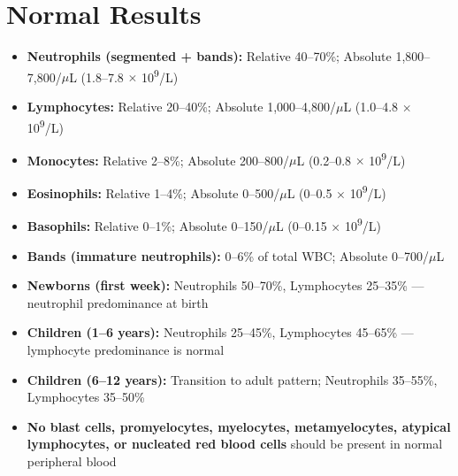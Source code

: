 \section*{Normal Results}
\begin{itemize}
  \item \textbf{Neutrophils (segmented + bands):} Relative 40--70\%; Absolute 1,800--7,800/$\mu$L (1.8--7.8 $\times$ 10\textsuperscript{9}/L)
  \item \textbf{Lymphocytes:} Relative 20--40\%; Absolute 1,000--4,800/$\mu$L (1.0--4.8 $\times$ 10\textsuperscript{9}/L)
  \item \textbf{Monocytes:} Relative 2--8\%; Absolute 200--800/$\mu$L (0.2--0.8 $\times$ 10\textsuperscript{9}/L)
  \item \textbf{Eosinophils:} Relative 1--4\%; Absolute 0--500/$\mu$L (0--0.5 $\times$ 10\textsuperscript{9}/L)
  \item \textbf{Basophils:} Relative 0--1\%; Absolute 0--150/$\mu$L (0--0.15 $\times$ 10\textsuperscript{9}/L)
  \item \textbf{Bands (immature neutrophils):} 0--6\% of total WBC; Absolute 0--700/$\mu$L
  \item \textbf{Newborns (first week):} Neutrophils 50--70\%, Lymphocytes 25--35\% --- neutrophil predominance at birth
  \item \textbf{Children (1--6 years):} Neutrophils 25--45\%, Lymphocytes 45--65\% --- lymphocyte predominance is normal
  \item \textbf{Children (6--12 years):} Transition to adult pattern; Neutrophils 35--55\%, Lymphocytes 35--50\%
  \item \textbf{No blast cells, promyelocytes, myelocytes, metamyelocytes, atypical lymphocytes, or nucleated red blood cells} should be present in normal peripheral blood
\end{itemize}

